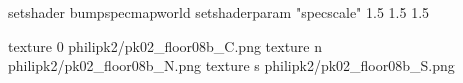 setshader bumpspecmapworld
setshaderparam "specscale" 1.5 1.5 1.5

texture 0 philipk2/pk02_floor08b_C.png
texture n philipk2/pk02_floor08b_N.png
texture s philipk2/pk02_floor08b_S.png

